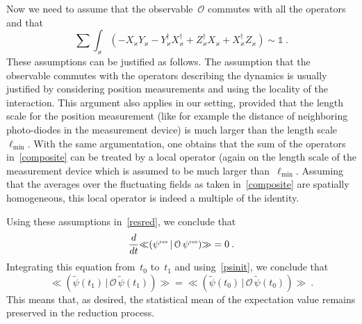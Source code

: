 \documentclass[reqno,11pt]{amsart}
\numberwithin{equation}{section}
\newcommand{\beq}{\begin{equation}}
\newcommand{\eeq}{\end{equation}}
\newcommand{\bbra}{\mathopen{\ll}}
\newcommand{\kket}{\mathclose{\gg}}
\newcommand{\1}{\mathds{1}}
\newcommand{\sint}{\sum  \!\!\!\!\!\!\! \int }
\newcommand{\res}{\text{\rm{\tiny{res}}}}
\begin{document}
{Now we need to assume that the observable~${\mathcal{O}}$ commutes with all the operators and that
\beq \label{composite}
\sint_\varkappa (-X_\varkappa Y_\varkappa - Y_\varkappa^\dagger X_\varkappa^\dagger
+ Z_\varkappa^\dagger X_\varkappa + X_\varkappa^\dagger Z_\varkappa) \sim \1 \:.
\eeq
These assumptions can be justified as follows.
The assumption that the observable commutes with the operators describing the dynamics
is usually justified by considering position measurements and using the locality of the interaction.
This argument also applies in our setting, provided that the length scale for the position measurement
(like for example the distance of neighboring photo-diodes in the measurement device) is much larger than
the length scale~$\ell_{\min}$. With the same argumentation, one obtains that the sum of the operators
in~\eqref{composite} can be treated by a local operator (again on the length scale of the measurement
device which is assumed to be much larger than~$\ell_{\min}$.
Assuming that the averages over the fluctuating fields as taken in~\eqref{composite}
are spatially homogeneous, this local operator is indeed a multiple of the identity.

Using these assumptions in~\eqref{resred}, we conclude that
\beq \label{dtO}
\frac{d}{dt} \bbra (\psi^\res \,|\, {\mathcal{O}} \, \psi^\res) \kket = 0 \:.
\eeq
Integrating this equation from~$t_0$ to~$t_1$ and using~\eqref{psinit}, we conclude that
\[ \bbra (\tilde{\psi}(t_1) \,|\, {\mathcal{O}} \, \tilde{\psi}(t_1)) \kket = \bbra (\tilde{\psi}(t_0) \,|\, {\mathcal{O}} \, \tilde{\psi}(t_0)) \kket \:. \]
This means that, as desired, the statistical mean of the expectation value remains preserved in the
reduction process. 

}
\end{document}
